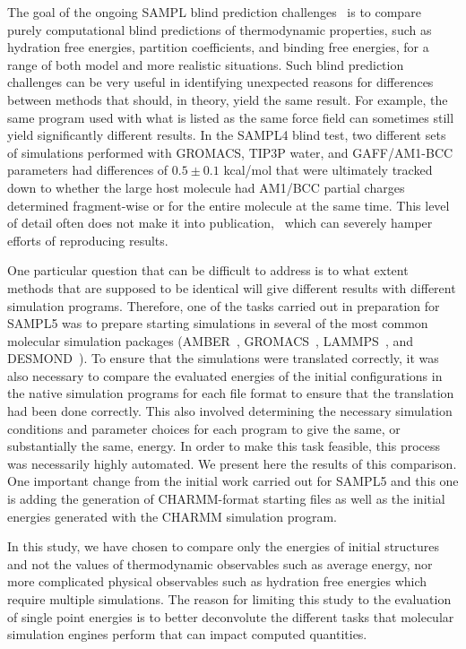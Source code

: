 The goal of the ongoing SAMPL blind prediction
challenges~\citep{Muddana2014SAMPL4,Muddana2012a,geballe_sampl2_2010,guthrie_blind_2009}
is to compare purely computational blind predictions of thermodynamic
properties, such as hydration free energies, partition coefficients,
and binding free energies, for a range of both model and more realistic
situations. Such blind prediction challenges can be very useful in
identifying unexpected reasons for differences between methods that
should, in theory, yield the same result. For example, the same program used
with what is listed as the same force field can sometimes still yield
significantly different results. In the SAMPL4 blind test, two
different sets of simulations performed with GROMACS, TIP3P water, and
GAFF/AM1-BCC parameters had differences of $0.5 \pm 0.1$
kcal/mol that were ultimately tracked down to whether the large host
molecule had AM1/BCC partial charges determined fragment-wise or for
the entire molecule at the same time. This level of detail often
does not make it into publication,~\cite{Monroe2014} which can severely hamper
efforts of reproducing results.

One particular question that can be difficult to address is to what
extent methods that are supposed to be identical will give different
results with different simulation programs.  Therefore, one of the
tasks carried out in preparation for SAMPL5 was to prepare starting
simulations in several of the most common molecular simulation
packages (AMBER~\citep{Amber14}, GROMACS~\citep{hess_gromacs_2008},
LAMMPS~\citep{plimpton_fast_1995}, and
DESMOND~\citep{bowers_scalable_2006}). To ensure that the simulations
were translated correctly, it was also necessary to compare the
evaluated energies of the initial configurations in the native
simulation programs for each file format to ensure that the
translation had been done correctly.  This also involved determining
the necessary simulation conditions and parameter choices for each program to
give the same, or substantially the same, energy.  In order to make this task
feasible, this process was necessarily highly automated. We present here the
results of this comparison. One important change from the initial work carried
out for SAMPL5 and this one is adding the generation of CHARMM-format starting
files as well as the initial energies generated with the CHARMM simulation
program.

In this study, we have chosen to compare only the energies of initial
structures and not the values of thermodynamic observables such as
average energy, nor more complicated physical observables such as
hydration free energies which require multiple simulations.  The
reason for limiting this study to the evaluation of single point
energies is to better deconvolute the different tasks that molecular
simulation engines perform that can impact computed quantities.

